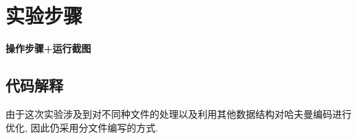 \section{实验步骤}
    \textbf{操作步骤+运行截图}
    \subsection{代码解释}
        \par 由于这次实验涉及到对不同种文件的处理以及利用其他数据结构对哈夫曼编码进行优化, 因此仍采用分文件编写的方式.
        \subsubsection{}